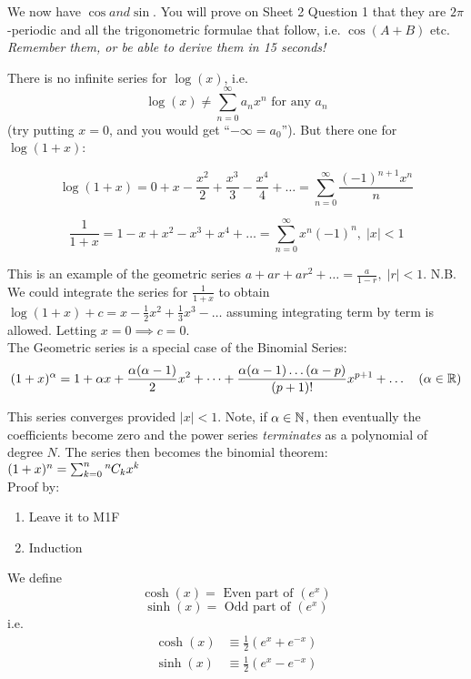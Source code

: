 \documentclass[twoside]{scrartcl}
\newcommand*{\permcomb}[4][0mu]{{{}^{#3}\mkern#1#2_{#4}}}
\newcommand*{\comb}[1][-1mu]{\permcomb[#1]{C}}
\begin{document}
We now have $\cos and \sin$. You will prove on Sheet 2 Question 1 that they are $2\pi$-periodic and all the trigonometric formulae that follow, i.e. $\cos(A+B)$ etc. \textit{Remember them, or be able to derive them in 15 seconds!}

\pagebreak



There is no infinite series for $\log(x)$, i.e.
\[\log(x) \neq \displaystyle{\sum_{n=0}^{\infty} a_n x^n}\text{ for any }a_n\] (try putting $x=0$, and you would get ``$-\infty = a_0$''). But there one for $\log(1+x)$: 

\[\displaystyle{\log(1+x) = 0 + x - \frac{x^2}{2} + \frac{x^3}{3} - \frac{x^4}{4} + \dots = \sum_{n=0}^{\infty} \frac{(-1)^{n+1}x^n}{n} }\]

\[\displaystyle{\frac{1}{1+x} = 1 - x + x^2 - x^3 + x^4 + \dots = \sum_{n=0}^{\infty} x^n(-1)^n, \; |x| < 1 }\]

This is an example of the geometric series $a + ar + ar^2 + \dots = \frac{a}{1-r}, \; |r|<1$. N.B. We could integrate the series for $\frac{1}{1+x}$ to obtain $\log(1+x) + c = x - \frac{1}{2}x^2 + \frac{1}{3}x^3 - \dots$ assuming integrating term by term is allowed. Letting $x = 0 \implies c = 0$. \\

The Geometric series is a special case of the Binomial Series:
\[\displaystyle{(1+x)^{\alpha} = 1 + \alpha x + \frac{\alpha(\alpha -1)}{2}x^2 + \dots + \frac{\alpha(\alpha-1)\dots(\alpha-p)}{(p+1)!}x^{p+1} + \dots \quad (\alpha \in \mathbb{R}) }\]

This series converges provided $|x|<1$. Note, if $\alpha \in \mathbb{N}$, then eventually the coefficients become zero and the power series \emph{terminates} as a polynomial of degree $N$. The series then becomes the binomial theorem: $(1+x)^n = \sum_{k=0}^{n} \comb{n}{k} x^k$\\

Proof by: 
\begin{enumerate}
\item Leave it to M1F
\item Induction
\end{enumerate}

\vspace*{5pt}

\begin{definition}
We define 
\[\cosh(x) = \text{ Even part of } (e^x)\]	
\[\sinh(x) = \text{ Odd part of } (e^x)\]	
i.e. 
\[
\begin{aligned}
  \cosh(x) &\equiv \frac{1}{2}(e^x + e^{-x})\\[0.2cm]
  \sinh(x) &\equiv \frac{1}{2}(e^x - e^{-x})
\end{aligned}
\]
\end{definition}
\end{document}
